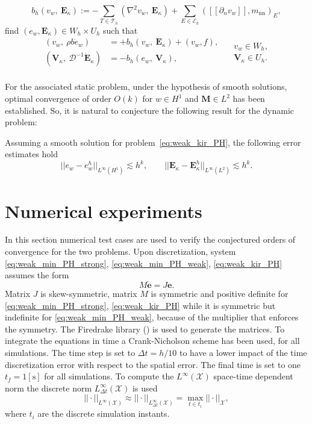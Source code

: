 \[
b_h(v_w, \ \bm{E}_{\kappa}) := - \sum_{T \in \mathcal{T}_h} ( \nabla^2 v_w, \ \bm{E}_\kappa) + \sum_{E \in \mathcal{E}_h} ([\![\partial_n v_w]\!], m_{\text{nn}})_{E}, 
\]
find $(e_w, \bm{E}_\kappa) \in W_h \times U_h$ such that
\begin{equation}
\label{eq:weak_kir_PH}
\begin{aligned}
(v_w, \ \rho b \dot{e}_w) &= +b_h(v_w, \ \bm{E}_{\kappa}) + (v_w, f), \\ 
(\bm{V}_\kappa, \ \mathcal{D}^{-1} \dot{\bm{E}}_\kappa) &= -b_h(e_w, \ \bm{V}_{\kappa}), \\ 
\end{aligned} \quad
\begin{aligned}
v_w \in W_h, \\
\bm{V}_\kappa \in U_h. \\
\end{aligned}
\end{equation}

For the associated static problem, under the hypothesis of smooth solutions, optimal convergence of order $O(k)$ for $w \in H^1$ and $\bm{M} \in L^2$ has been established. So, it is natural to conjecture the following result for the dynamic problem:
\begin{conjecture}
	Assuming a smooth solution for problem~\eqref{eq:weak_kir_PH}, the following error estimates hold
	\begin{equation}
	\label{eq:errHHJ}
	||e_w - e_w^h||_{L^{\infty} (H^1)} \lesssim h^{k}, \qquad
	||\bm{E}_\kappa - \bm{E}_\kappa^h||_{L^{\infty} (L^2)} \lesssim h^{k}.
	\end{equation}
\end{conjecture}

\section{Numerical experiments}
\label{sec:numerics}
In this section numerical test cases are used to verify the conjectured orders of convergence for the two problems. Upon discretization, system \eqref{eq:weak_min_PH_strong}, \eqref{eq:weak_min_PH_weak}, \eqref{eq:weak_kir_PH} assumes the form 
\[
M \dot{\bm{e}} = J \bm{e}.
\]
Matrix $J$ is skew-symmetric, matrix $M$ is symmetric and positive definite for \eqref{eq:weak_min_PH_strong}, \eqref{eq:weak_kir_PH} while it is symmetric but indefinite for \eqref{eq:weak_min_PH_weak}, because of the multiplier that enforces the symmetry. The Firedrake library (\cite{rathgeber2017firedrake}) is used to generate the matrices. To integrate the equations in time a Crank-Nicholson scheme has been used, for all simulations. The time step is set to $\Delta t = h/10$ to have a lower impact of the time discretization error with respect to the spatial error. The final time is set to one $t_f = 1 [\textrm{s}]$ for all simulations. To compute the $L^\infty (\mathcal{X})$ space-time dependent norm  the discrete norm $L^\infty_{\Delta t} (\mathcal{X})$ is used
\[
||\cdot ||_{L^\infty (\mathcal{X})} \approx || \cdot ||_{L^\infty_{\Delta t} (\mathcal{X})} = \max_{t \in t_i} ||\cdot||_{\mathcal{X}},
\]
where $t_i$ are the discrete simulation instants. 
